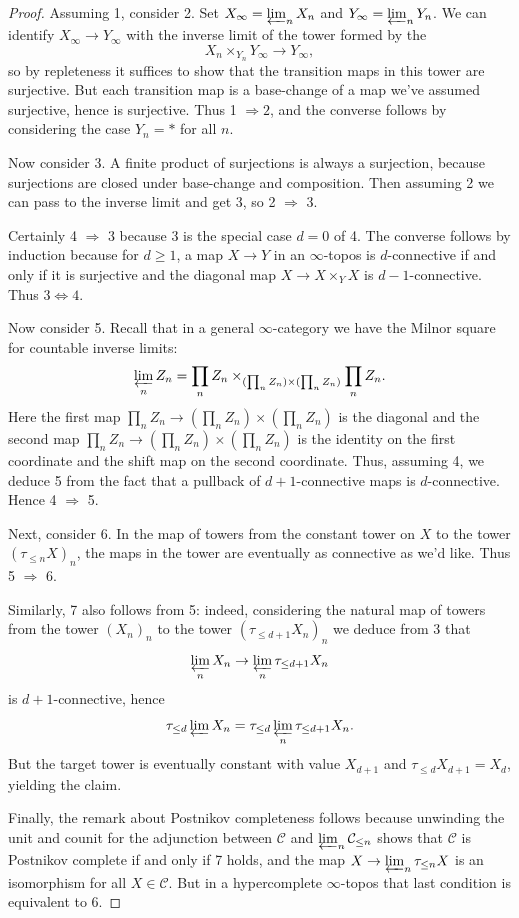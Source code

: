 \documentclass[12pt]{article}
\begin{document}
\begin{proof}
Assuming 1, consider 2.  Set $X_\infty=\varprojlim_n X_n$ and $Y_\infty=\varprojlim_n Y_n$.  We can identify $X_\infty\rightarrow Y_\infty$ with the inverse limit of the tower formed by the
$$X_n\times_{Y_n}Y_\infty\rightarrow Y_\infty,$$
so by repleteness it suffices to show that the transition maps in this tower are surjective.  But each transition map is a base-change of a map we've assumed surjective, hence is surjective.  Thus 1 $\Rightarrow 2$, and the converse follows by considering the case $Y_n=\ast$ for all $n$.

Now consider 3.  A finite product of surjections is always a surjection, because surjections are closed under base-change and composition.  Then assuming 2 we can pass to the inverse limit and get 3, so 2 $\Rightarrow$ 3.

Certainly 4 $\Rightarrow$ 3 because 3 is the special case $d=0$ of 4.  The converse follows by induction because for $d\geq 1$, a map $X\rightarrow Y$ in an $\infty$-topos is $d$-connective if and only if it is surjective and the diagonal map $X\rightarrow X\times_Y X$ is $d-1$-connective.  Thus $3\Leftrightarrow 4$.

Now consider 5.  Recall that in a general $\infty$-category we have the Milnor square for countable inverse limits:
$$\varprojlim_n Z_n = \prod_nZ_n\times_{(\prod_n Z_n)\times (\prod_{n}Z_{n})}\prod_n Z_n.$$
Here the first map $\prod_n Z_n\rightarrow (\prod_n Z_n)\times(\prod_n Z_n)$ is the diagonal and the second map $\prod_n Z_n\rightarrow (\prod_n Z_n)\times(\prod_n Z_n)$ is the identity on the first coordinate and the shift map on the second coordinate.  Thus, assuming 4, we deduce 5 from the fact that a pullback of $d+1$-connective maps is $d$-connective.  Hence 4 $\Rightarrow$ 5.

Next, consider 6.  In the map of towers from the constant tower on $X$ to the tower $(\tau_{\leq n}X)_n$, the maps in the tower are eventually as connective as we'd like.  Thus 5 $\Rightarrow$ 6.

Similarly, 7 also follows from 5: indeed, considering the natural map of towers from the tower $(X_n)_n$ to the tower $(\tau_{\leq d+1}X_n)_n$ we deduce from 3 that
$$\varprojlim_n X_n\rightarrow \varprojlim_n \tau_{\leq d+1}X_n$$
is $d+1$-connective, hence
$$\tau_{\leq d}\varprojlim X_n = \tau_{\leq d}\varprojlim_n \tau_{\leq d+1}X_n.$$
But the target tower is eventually constant with value $X_{d+1}$ and $\tau_{\leq d}X_{d+1}=X_d$, yielding the claim.

Finally, the remark about Postnikov completeness follows because unwinding the unit and counit for the adjunction between $\mathcal{C}$ and $\varprojlim_n \mathcal{C}_{\leq n}$ shows that $\mathcal{C}$ is Postnikov complete if and only if 7 holds, and the map $X\rightarrow\varprojlim_n \tau_{\leq n}X$ is an isomorphism for all $X\in\mathcal{C}$.  But in a hypercomplete $\infty$-topos that last condition is equivalent to 6.
\end{proof}
\end{document}
